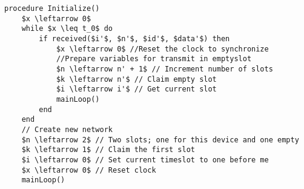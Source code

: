 \begin{minipage}{\linewidth} %
\begin{lstlisting}[label=lst:setupCCRC,style=pseudocode,mathescape=true,caption={Pseudocode example of the special case procedure Initialize()},basicstyle=\ttfamily]
procedure Initialize()
    $x \leftarrow 0$
    while $x \leq t_0$ do
        if received($i'$, $n'$, $id'$, $data'$) then
            $x \leftarrow 0$ //Reset the clock to synchronize
            //Prepare variables for transmit in emptyslot
            $n \leftarrow n' + 1$ // Increment number of slots
            $k \leftarrow n'$ // Claim empty slot
            $i \leftarrow i'$ // Get current slot
            mainLoop()
        end
    end
    // Create new network
    $n \leftarrow 2$ // Two slots; one for this device and one empty
    $k \leftarrow 1$ // Claim the first slot
    $i \leftarrow 0$ // Set current timeslot to one before me
    $x \leftarrow 0$ // Reset clock
    mainLoop()
\end{lstlisting}   
\end{minipage}
